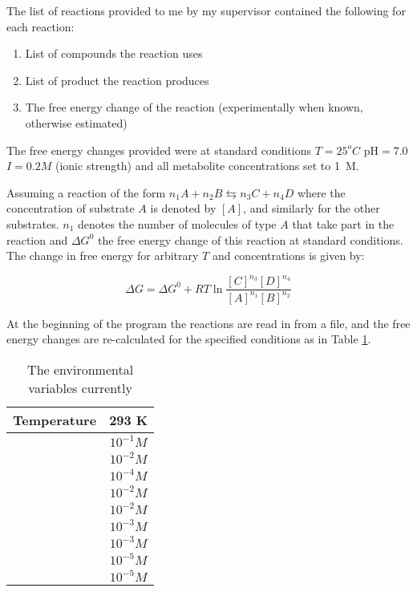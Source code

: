 \documentclass[10pt,a4paper]{article}
\begin{document}
	The list of reactions provided to me by my supervisor contained the following for each reaction: 
	\begin{enumerate}
		\item List of compounds the reaction uses
		\item List of product the reaction produces
		\item The free energy change of the reaction (experimentally when known, otherwise estimated) \cite{BartekLower}
	\end{enumerate}
	
	The free energy changes provided were at standard conditions $T=25  ^o C$ pH$=7.0$ $I=0.2 M$ (ionic strength) and all metabolite concentrations set to 1~M.
	
	Assuming a reaction of the form $n_1A + n_2B \leftrightarrows n_3C + n_4D$ where the concentration of substrate $A$ is denoted by $[A]$, and similarly for the other substrates. $n_1$ denotes the number of molecules of type $A$ that take part in the reaction and  $\Delta G^0$  the free energy change of this reaction at standard conditions. The change in free energy for arbitrary $T$ and concentrations is given by: 
	
	\begin{equation}\label{eq:freeechange}
		\Delta G = \Delta G^0 + R T \ln \frac{[C]^{n_3}[D]^{n_4}}{[A]^{n_1}[B]^{n_2}}
	\end{equation}
	
	At the beginning of the program the reactions are read in from a file, and the free energy changes are re-calculated for the specified conditions as in Table \ref{environmentTable}. 
	
	\begin{table}
		\centering
	\begin{tabular}{|c|c|}
		
		\hline Temperature & 293 K \\ 
		\hline [ATP] & $10^{-1} M$ \\ 
		\hline [ADP] & $10^{-2} M$ \\ 
		\hline [AMP] & $10^{-4} M$ \\ 
		\hline [NAD] & $10^{-2} M$ \\ 
		\hline [NADH] & $10^{-2} M$ \\ 
		\hline [Pi] &  $10^{-3} M$\\ 
		\hline [PPi] & $10^{-3} M$ \\ 
		\hline [CO$_2$] & $10^{-5} M$ \\ 
		\hline [NH$_3$] & $10^{-5} M$ \\ 

		\hline 
	\end{tabular} 
	\caption{The environmental variables currently}
	\label{environmentTable}
	\end{table}
	
\end{document}
